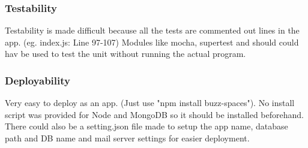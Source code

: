 \subsubsection{Testability}

Testability is made difficult because all the tests are commented out lines in the app. (eg. index.js: Line 97-107) Modules like mocha, supertest and should could hav be used to test the unit without running the actual program.

\subsubsection{Deployability}

Very easy to deploy as an app. (Just use "npm install buzz-spaces"). No install script was provided for Node and MongoDB so it should be installed beforehand. There could also be a setting.json file made to setup the app name, database path and DB name and mail server settings for easier deployment.